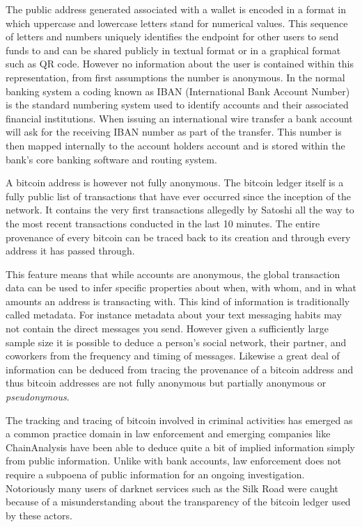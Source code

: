 The public address generated associated with a wallet is encoded in a format in
which uppercase and lowercase letters stand for numerical values. This sequence
of letters and numbers uniquely identifies the endpoint for other users to send
funds to and can be shared publicly in textual format or in a graphical format
such as QR code. However no information about the user is contained within this
representation, from first assumptions the number is anonymous. In the normal
banking system a coding known as IBAN (International Bank Account Number) is the
standard numbering system used to identify accounts and their associated
financial institutions. When issuing an international wire transfer a bank
account will ask for the receiving IBAN number as part of the transfer.  This
number is then mapped internally to the account holders account and is stored
within the bank's core banking software and routing system.

A bitcoin address is however not fully anonymous. The bitcoin ledger
itself is a fully public list of transactions that have ever occurred
since the inception of the network. It contains the very first
transactions allegedly by Satoshi all the way to the most recent
transactions conducted in the last 10 minutes. The entire provenance of
every bitcoin can be traced back to its creation and through every
address it has passed through.

This feature means that while accounts are anonymous, the global
transaction data can be used to infer specific properties about when,
with whom, and in what amounts an address is transacting with. This kind
of information is traditionally called metadata. For instance metadata
about your text messaging habits may not contain the direct messages you
send. However given a sufficiently large sample size it is possible to
deduce a person's social network, their partner, and coworkers from the
frequency and timing of messages. Likewise a great deal of information
can be deduced from tracing the provenance of a bitcoin address and thus
bitcoin addresses are not fully anonymous but partially anonymous or
\textit{pseudonymous}.


The tracking and tracing of bitcoin involved in criminal activities has
emerged as a common practice domain in law enforcement and emerging
companies like ChainAnalysis have been able to deduce quite a bit of
implied information simply from public information. Unlike with bank
accounts, law enforcement does not require a
subpoena of public information for an ongoing investigation. Notoriously
many users of darknet services such as the Silk Road were caught because
of a misunderstanding about the transparency of the bitcoin ledger used
by these actors.

